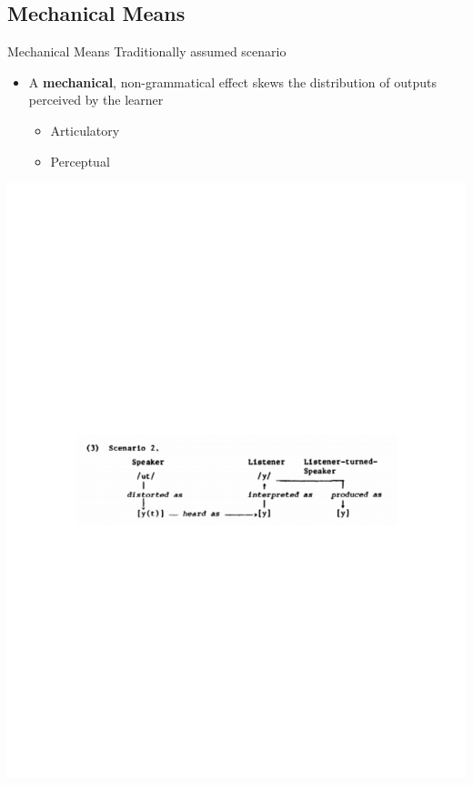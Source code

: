\documentclass[hyperref={pdfpagelabels=false}]{beamer}
\begin{document}
\subsection{Mechanical Means}
\begin{frame}{Mechanical Means}
	Traditionally assumed scenario \citep{Ohala1981} \\
	\begin{itemize}
		\item A \textbf{mechanical}, non-grammatical effect skews the distribution of outputs perceived by the learner 
		\begin{itemize} \pause
			\item Articulatory \pause
			\item Perceptual \pause
		\end{itemize}
	\end{itemize}
	\begin{center}
\includegraphics[trim=2cm 2cm 2cm 10cm, clip=true, width=1\textwidth]{Ohala81.pdf}

\end{center}
\end{frame}
\end{document}
